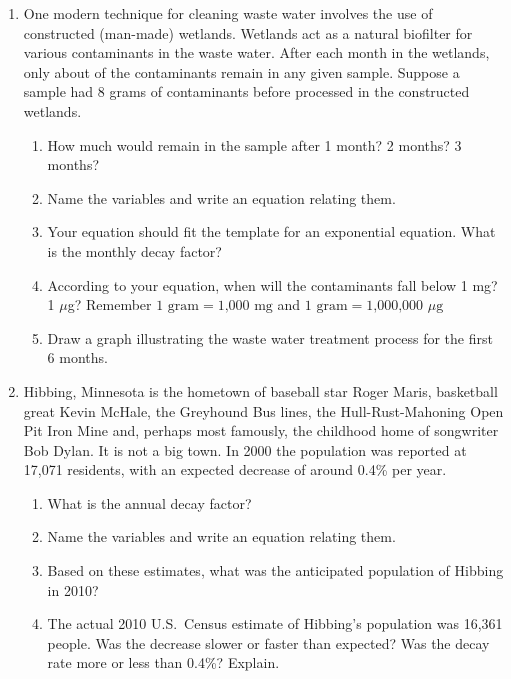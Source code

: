 \begin{enumerate}
\item One modern technique for cleaning waste water involves the use of constructed (man-made) wetlands.  Wetlands act as a natural biofilter for various contaminants in the waste water. After each month in the wetlands, only about  of the contaminants remain in any given sample.  Suppose a sample had 8 grams of contaminants before processed in the constructed wetlands.
\begin{enumerate}
\item How much would remain in the sample after 1 month?  2 months?  3 months?
\item Name the variables and write an equation relating them.
\item Your equation should fit the template for an exponential equation. What is the monthly decay factor?
\item According to your equation, when will the contaminants fall below 1 mg?  1 $\mu$g?  Remember $1 \text{ gram} = \text{1,000 mg}$ and $1 \text{ gram} = \text{1,000,000 } \mu \text{g}$
\item Draw a graph illustrating the waste water treatment process for the first 6 months.
\end{enumerate}  %

\item Hibbing, Minnesota is the hometown of baseball star Roger Maris, basketball great Kevin McHale, the Greyhound Bus lines, the Hull-Rust-Mahoning Open Pit Iron Mine and, perhaps most famously, the childhood home of songwriter Bob Dylan.
It is not a big town.  In 2000 the population  was reported at  17,071 residents, with an expected decrease of around 0.4\% per year.
\begin{enumerate}
\item What is the annual decay factor?
\item Name the variables and write an equation relating them.
\item Based on these estimates, what was the anticipated population of Hibbing in 2010?
\item The actual 2010 U.S.\ Census estimate of Hibbing's population was 16,361 people.  Was the decrease slower or faster than expected?  Was the decay rate more or less than 0.4\%?  Explain.
\end{enumerate}


\end{enumerate}
